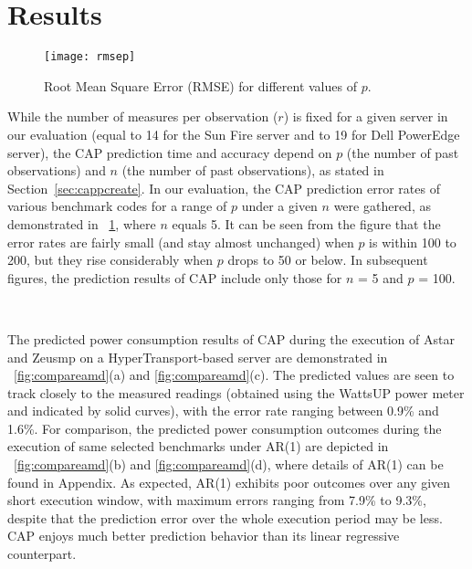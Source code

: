 \section{Results}
\label{sec:htcase}
\begin{figure}[tp]
  \centering
  \texttt{[image: rmsep]}
  \caption{Root Mean Square Error (RMSE) for different values of $p$.}
  \label{fig:rmsep}
\end{figure}
While the number of measures per observation ($r$) is fixed for a given
server in our evaluation (equal to 14 for the Sun Fire server and to 19
for Dell PowerEdge server), the CAP prediction time and accuracy depend
on $p$ (the number of past observations) and $n$ (the number of past
observations), as stated in Section~\ref{sec:cappcreate}.  In our
evaluation, the CAP prediction error rates of various benchmark codes
for a range of $p$ under a given $n$ were gathered, as demonstrated in
\figurename~\ref{fig:rmsep}, where $n$ equals 5.  It can be seen from
the figure that the error rates are fairly small (and stay almost
unchanged) when $p$ is within 100 to 200, but they rise considerably
when $p$ drops to 50 or below.  In subsequent figures, the prediction
results of CAP include only those for $n$ = 5 and $p$ = 100.

\begin{figure*}[tp]
  \centering
  \\
  \caption{Actual power results versus predicted results for AMD Opteron.}
  \label{fig:compareamd}
\end{figure*}
The predicted power consumption results of CAP during the execution of
Astar and Zeusmp on a HyperTransport-based server are demonstrated in
\figurenames~\ref{fig:compareamd}(a) and \ref{fig:compareamd}(c).  The
predicted values are seen to track closely to the measured readings
(obtained using the WattsUP power meter and indicated by solid curves),
with the error rate ranging between 0.9\% and 1.6\%.  For comparison,
the predicted power consumption outcomes during the execution of same
selected benchmarks under AR(1) are depicted in
\figurenames~\ref{fig:compareamd}(b) and \ref{fig:compareamd}(d), where
details of AR(1) can be found in Appendix.  As expected, AR(1) exhibits
poor outcomes over any given short execution window, with maximum errors
ranging from 7.9\% to 9.3\%, despite that the prediction error over the
whole execution period may be less.  CAP enjoys much better prediction
behavior than its linear regressive counterpart.

